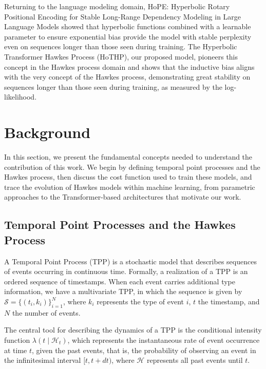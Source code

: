 \documentclass[runningheads]{llncs}
\begin{document}
Returning to the language modeling domain, HoPE: Hyperbolic Rotary Positional Encoding for Stable Long-Range Dependency Modeling in Large Language Models \cite{dai2025hope} showed that hyperbolic functions combined with a learnable parameter to ensure exponential bias provide the model with stable perplexity even on sequences longer than those seen during training. The Hyperbolic Transformer Hawkes Process (HoTHP), our proposed model, pioneers this concept in the Hawkes process domain and shows that the inductive bias aligns with the very concept of the Hawkes process, demonstrating great stability on sequences longer than those seen during training, as measured by the log-likelihood.

\section{Background}

In this section, we present the fundamental concepts needed to understand the contribution of this work. We begin by defining temporal point processes and the Hawkes process, then discuss the cost function used to train these models, and trace the evolution of Hawkes models within machine learning, from parametric approaches to the Transformer-based architectures that motivate our work.

\subsection{Temporal Point Processes and the Hawkes Process}

A Temporal Point Process (TPP) is a stochastic model that describes sequences of events occurring in continuous time. Formally, a realization of a TPP is an ordered sequence of timestamps. When each event carries additional type information, we have a multivariate TPP, in which the sequence is given by $\mathcal{S} = \{(t_i, k_i)\}_{i=1}^N$, where $k_i$ represents the type of event $i$, $t$ the timestamp, and $N$ the number of events.

The central tool for describing the dynamics of a TPP is the conditional intensity function $\lambda(t \mid \mathcal{H}_t)$, which represents the instantaneous rate of event occurrence at time $t$, given the past events, that is, the probability of observing an event in the infinitesimal interval $[t, t + dt)$, where $\mathcal{H}$ represents all past events until $t$.
\end{document}
